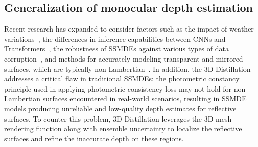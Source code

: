 \subsection{Generalization of monocular depth estimation}
\label{sec:rel_genmono}
Recent research has expanded to consider factors such as the impact of weather variations~\citep{saunders2023self, gasperini2023robust}, the differences in inference capabilities between CNNs and Transformers~\citep{bae2023study}, the robustness of SSMDEs against various types of data corruption~\citep{kong2024robodepth}, and methods for accurately modeling transparent and mirrored surfaces, which are typically non-Lambertian~\citep{costanzino2023learning}.
In addition, the 3D Distillation~\citep{shi20233d} addresses a critical flaw in traditional SSMDEs: the photometric constancy principle used in applying photometric consistency loss may not hold for non-Lambertian surfaces encountered in real-world scenarios, resulting in SSMDE models producing unreliable and low-quality depth estimates for reflective surfaces.
To counter this problem, 3D Distillation leverages the 3D mesh rendering function along with ensemble uncertainty to localize the reflective surfaces and refine the inaccurate depth on these regions.

